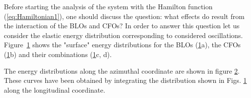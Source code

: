 Before starting the analysis of the system with the Hamilton function (\ref{eq:Hamiltonian1}), one should discuss the question: what effects do result from the interaction of the BLOs and CFOs?
In order to answer this question let us consider the  elastic energy distribution corresponding to considered oscillations.
Figure~\ref{fig_energymap1} shows the "surface" energy distributions for the BLOs (\ref{fig_energymap1}a), the CFOs (\ref{fig_energymap1}b) and their combinations (\ref{fig_energymap1}c, d).

\begin{figure}
\label{fig_energymap1}
\end{figure}

The energy distributions along the azimuthal coordinate are shown in figure \ref{fig_energy1}. These curves have been obtained by integrating the distribution shown in Figs. \ref{fig_energymap1} along the longitudinal coordinate. 

\begin{figure}
\label{fig_energy1}
\end{figure}

